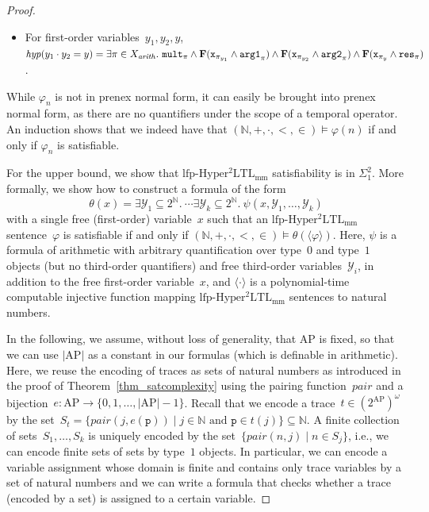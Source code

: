 \documentclass[dvipsnames,10pt,a4paper]{amsart}
\theoremstyle{definition}
\theoremstyle{remark}
\newcommand{\nats}{\mathbb{N}}
\renewcommand{\phi}{\varphi}
\newcommand{\size}[1]{|#1|}
\newcommand{\pow}[1]{2^{#1}}
\newcommand{\set}[1]{\{#1\}}
\newcommand{\F}{\mathop{\mathbf{F}\vphantom{a}}\nolimits}
\newcommand{\lfpsohyltlfp}{\mathrm{lfp\text{-}{Hyper^2LTL_{\mathrm{mm}}}}\xspace}
\newcommand{\ap}[0]{\mathrm{AP}}
\newcommand{\inprop}{\mathtt{x}}
\newcommand{\proposition}{\texttt{p}}
\newcommand{\argone}{\texttt{arg1}}
\newcommand{\argtwo}{\texttt{arg2}}
\newcommand{\res}{\texttt{res}}
\newcommand{\mult}{\texttt{mult}}
\newcommand{\hyperize}{{\mathit{hyp}}}
\newcommand{\pair}{\mathit{pair}}
\newcommand{\arith}{\mathit{arith}}
\newcommand{\natsstruct}{(\nats, +, \cdot, <, \in)}
\newcommand{\encode}[1]{\langle #1\rangle}
\begin{document}
\begin{proof}
\begin{itemize}
    \item For first-order variables~$y_1,y_2,y$, $\hyperize(y_1 \cdot y_2=y) = \exists \pi \in X_\arith.\ \mult_\pi \land \F(\inprop_{\pi_{y_1}}\land\argone_\pi) \land \F(\inprop_{\pi_{y_2}}\land\argtwo_\pi) \land \F(\inprop_{\pi_y}\land\res_\pi)$.
    
\end{itemize}
While $\phi_n$ is not in prenex normal form, it can easily be brought into prenex normal form, as there are no quantifiers under the scope of a temporal operator.
An induction shows that we indeed have that $\natsstruct\models\phi(n)$ if and only if $\phi_n$ is satisfiable.
    
For the upper bound, we show that $\lfpsohyltlfp$ satisfiability is in $\Sigma_1^2$. More formally, we show how to construct a formula of the form
\[
\theta(x) = \exists \mathcal{Y}_1\subseteq \pow{\nats}.\ \cdots \exists \mathcal{Y}_k\subseteq \pow{\nats}. \ \psi(x, \mathcal{Y}_1, \ldots,\mathcal{Y}_k)
\]
with a single free (first-order) variable~$x$ such that an $\lfpsohyltlfp$ sentence~$\phi$ is satisfiable if and only if $\natsstruct \models \theta(\encode{\phi})$.
Here, $\psi$ is a formula of arithmetic with arbitrary quantification over type~$0$ and type~$1$ objects (but no third-order quantifiers) and free third-order variables~$\mathcal{Y}_i$, in addition to the free first-order variable~$x$, and $\encode{\cdot}$ is a polynomial-time computable injective function mapping $\lfpsohyltlfp$ sentences to natural numbers.

In the following, we assume, without loss of generality, that $\ap$ is fixed, so that we can use $\size{\ap}$ as a constant in our formulas (which is definable in arithmetic). 
Here, we reuse the encoding of traces as sets of natural numbers as introduced in the proof of Theorem~\ref{thm_satcomplexity} using the pairing function~$\pair$ and a bijection~$e \colon \ap \rightarrow\set{0,1,\ldots,\size{\ap}-1}$.
Recall that we encode a trace~$t \in (\pow{\ap})^\omega$ by the set~$S_t =\set{\pair(j,e(\proposition)) \mid j \in \nats \text{ and } \proposition \in t(j)} \subseteq \nats$.
A finite collection of sets~$S_1, \ldots, S_k$ is uniquely encoded by the set~$\set{\pair(n,j) \mid n \in S_j}$, i.e., we can encode finite sets of sets by type~$1$ objects.
In particular, we can encode a variable assignment whose domain is finite and contains only trace variables by a set of natural numbers and we can write a  formula that checks whether a trace (encoded by a set) is assigned to a certain variable.


\end{proof}
\end{document}
